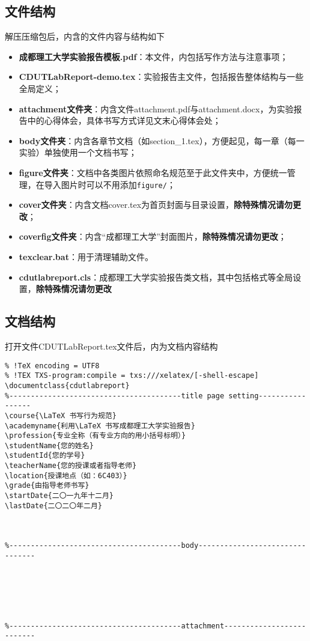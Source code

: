 \subsection{文件结构}
解压压缩包后，内含的文件内容与结构如下
\begin{itemize}
\item \textbf{成都理工大学实验报告模板.pdf}：本文件，内包括写作方法与注意事项；
\item \textbf{CDUTLabReport-demo.tex}：实验报告主文件，包括报告整体结构与一些全局定义；
\item \textbf{attachment文件夹}：内含文件attachment.pdf与attachment.docx，为实验报告中的心得体会，具体书写方式详见文末心得体会处；
\item \textbf{body文件夹}：内含各章节文档（如section\_1.tex），方便起见，每一章（每一实验）单独使用一个文档书写；
\item \textbf{figure文件夹}：文档中各类图片依照命名规范至于此文件夹中，方便统一管理，在导入图片时可以不用添加\verb|figure/|；
\item \textbf{cover文件夹}：内含文档cover.tex为首页封面与目录设置，\textbf{除特殊情况请勿更改}；
\item \textbf{coverfig文件夹}：内含“成都理工大学”封面图片，\textbf{除特殊情况请勿更改}；
\item \textbf{texclear.bat}：用于清理辅助文件。
\item \textbf{cdutlabreport.cls}：成都理工大学实验报告类文档，其中包括格式等全局设置，\textbf{除特殊情况请勿更改}
\end{itemize}
\subsection{文档结构}
打开文件CDUTLabReport.tex文件后，内为文档内容结构
\begin{verbatim}
% !TeX encoding = UTF8
% !TEX TXS-program:compile = txs:///xelatex/[-shell-escape]
\documentclass{cdutlabreport}
%----------------------------------------title page setting-----------------
\course{\LaTeX 书写行为规范}
\academyname{利用\LaTeX 书写成都理工大学实验报告}
\profession{专业全称（有专业方向的用小括号标明）}
\studentName{您的姓名}
\studentId{您的学号}
\teacherName{您的授课或者指导老师}
\location{授课地点（如：6C403）}
\grade{由指导老师书写}
\startDate{二〇一九年十二月}
\lastDate{二〇二〇年二月}



%----------------------------------------body--------------------------------






%----------------------------------------attachment--------------------------


\end{verbatim}

